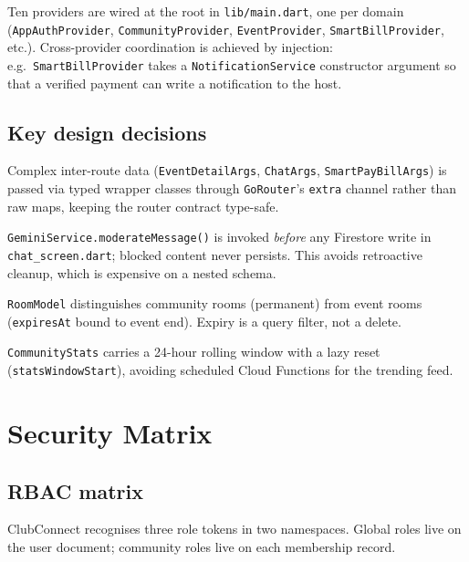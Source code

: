 \documentclass[11pt,a4paper]{article}
\begin{document}
Ten providers are wired at the root in \texttt{lib/main.dart}, one per
domain (\texttt{AppAuthProvider}, \texttt{CommunityProvider},
\texttt{EventProvider}, \texttt{SmartBillProvider}, etc.). Cross-provider
coordination is achieved by injection: e.g.\ \texttt{SmartBillProvider}
takes a \texttt{NotificationService} constructor argument so that a
verified payment can write a notification to the host.

\subsection{Key design decisions}

\begin{description}[leftmargin=*,style=nextline,nosep]
  \item[Route argument wrappers.] Complex inter-route data
        (\texttt{EventDetailArgs}, \texttt{ChatArgs},
        \texttt{SmartPayBillArgs}) is passed via typed wrapper classes
        through \texttt{GoRouter}'s \texttt{extra} channel rather than raw
        maps, keeping the router contract type-safe.
  \item[Pre-write AI moderation.] \texttt{GeminiService.moderateMessage()}
        is invoked \emph{before} any Firestore write in
        \texttt{chat\_screen.dart}; blocked content never persists. This
        avoids retroactive cleanup, which is expensive on a nested
        schema.
  \item[Event-scoped chat rooms.] \texttt{RoomModel} distinguishes
        community rooms (permanent) from event rooms (\texttt{expiresAt}
        bound to event end). Expiry is a query filter, not a delete.
  \item[Lazy stats windows.] \texttt{CommunityStats} carries a 24-hour
        rolling window with a lazy reset (\texttt{statsWindowStart}),
        avoiding scheduled Cloud Functions for the trending feed.
\end{description}

\section{Security Matrix}
\label{sec:sec}

\subsection{RBAC matrix}

ClubConnect recognises three role tokens in two namespaces. Global roles
live on the user document; community roles live on each membership record.
\end{document}
